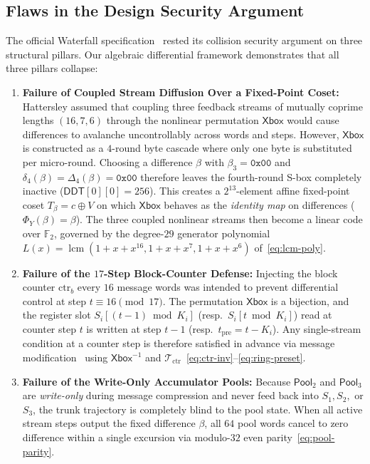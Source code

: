 \documentclass[11pt,a4paper]{article}
\theoremstyle{definition}
\theoremstyle{remark}
\newcommand{\Ftwo}{\mathbb{F}_2}
\newcommand{\Xbox}{\mathsf{Xbox}}
\newcommand{\Pool}{\mathsf{Pool}}
\newcommand{\lcm}{\operatorname{lcm}}
\begin{document}
\subsection{Flaws in the Design Security Argument}
The official Waterfall specification~\cite{Hat08} rested its collision security argument on three structural pillars. Our algebraic differential framework demonstrates that all three pillars collapse:
\begin{enumerate}[leftmargin=2em]
    \item \textbf{Failure of Coupled Stream Diffusion Over a Fixed-Point Coset:} Hattersley assumed that coupling three feedback streams of mutually coprime lengths $(16, 7, 6)$ through the nonlinear permutation $\Xbox$ would cause differences to avalanche uncontrollably across words and steps. However, $\Xbox$ is constructed as a $4$-round byte cascade where only one byte is substituted per micro-round. Choosing a difference $\beta$ with $\beta_3 = \mathtt{0x00}$ and $\delta_4(\beta) = \Delta_4(\beta) = \mathtt{0x00}$ therefore leaves the fourth-round S-box completely inactive ($\mathsf{DDT}[0][0] = 256$). This creates a $2^{13}$-element affine fixed-point coset $T_\beta = c \oplus V$ on which $\Xbox$ behaves as the \emph{identity map} on differences ($\Phi_Y(\beta) = \beta$). The three coupled nonlinear streams then become a linear code over $\Ftwo$, governed by the degree-$29$ generator polynomial $L(x) = \lcm(1+x+x^{16}, 1+x+x^7, 1+x+x^6)$ of~\eqref{eq:lcm-poly}.
    \item \textbf{Failure of the $17$-Step Block-Counter Defense:} Injecting the block counter $\mathrm{ctr}_b$ every $16$ message words was intended to prevent differential control at step $t \equiv 16 \pmod{17}$. The permutation $\Xbox$ is a bijection, and the register slot $S_i[(t-1)\bmod K_i]$ (resp.\ $S_i[t \bmod K_i]$) read at counter step $t$ is written at step $t - 1$ (resp.\ $t_{\mathrm{pre}} = t - K_i$). Any single-stream condition at a counter step is therefore satisfied in advance via message modification~\cite{WangYu05} using $\Xbox^{-1}$ and $\mathcal{T}_{\mathrm{ctr}}$~\eqref{eq:ctr-inv}--\eqref{eq:ring-preset}.
    \item \textbf{Failure of the Write-Only Accumulator Pools:} Because $\Pool_2$ and $\Pool_3$ are \emph{write-only} during message compression and never feed back into $S_1, S_2,$ or $S_3$, the trunk trajectory is completely blind to the pool state. When all active stream steps output the fixed difference $\beta$, all $64$ pool words cancel to zero difference within a single excursion via modulo-$32$ even parity~\eqref{eq:pool-parity}.
\end{enumerate}
\end{document}
